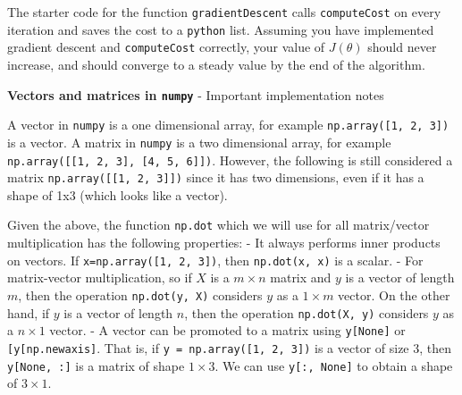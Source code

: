 \documentclass[11pt]{article}
\begin{document}
The starter code for the function \texttt{gradientDescent} calls
\texttt{computeCost} on every iteration and saves the cost to a
\texttt{python} list. Assuming you have implemented gradient descent and
\texttt{computeCost} correctly, your value of \(J(\theta)\) should never
increase, and should converge to a steady value by the end of the
algorithm.

\textbf{Vectors and matrices in \texttt{numpy}} - Important
implementation notes

A vector in \texttt{numpy} is a one dimensional array, for example
\texttt{np.array({[}1,\ 2,\ 3{]})} is a vector. A matrix in
\texttt{numpy} is a two dimensional array, for example
\texttt{np.array({[}{[}1,\ 2,\ 3{]},\ {[}4,\ 5,\ 6{]}{]})}. However, the
following is still considered a matrix
\texttt{np.array({[}{[}1,\ 2,\ 3{]}{]})} since it has two dimensions,
even if it has a shape of 1x3 (which looks like a vector).

Given the above, the function \texttt{np.dot} which we will use for all
matrix/vector multiplication has the following properties: - It always
performs inner products on vectors. If
\texttt{x=np.array({[}1,\ 2,\ 3{]})}, then \texttt{np.dot(x,\ x)} is a
scalar. - For matrix-vector multiplication, so if \(X\) is a
\(m\times n\) matrix and \(y\) is a vector of length \(m\), then the
operation \texttt{np.dot(y,\ X)} considers \(y\) as a \(1 \times m\)
vector. On the other hand, if \(y\) is a vector of length \(n\), then
the operation \texttt{np.dot(X,\ y)} considers \(y\) as a \(n \times 1\)
vector. - A vector can be promoted to a matrix using
\texttt{y{[}None{]}} or \texttt{{[}y{[}np.newaxis{]}}. That is, if
\texttt{y\ =\ np.array({[}1,\ 2,\ 3{]})} is a vector of size 3, then
\texttt{y{[}None,\ :{]}} is a matrix of shape \(1 \times 3\). We can use
\texttt{y{[}:,\ None{]}} to obtain a shape of \(3 \times 1\).
\end{document}
